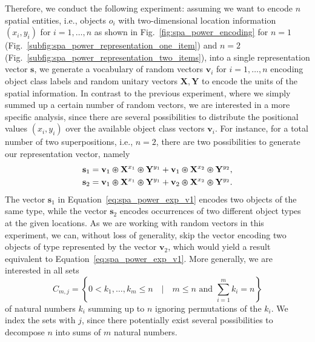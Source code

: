 Therefore, we conduct the following experiment: assuming we want to encode $n$ spatial entities, i.e., objects $o_{i}$ with two-dimensional location information $ \left(x_{i}, y_{i}\right)$ for $i=1, \ldots, n$ as shown in Fig.~\ref{fig:spa_power_encoding} for $n=1$ (Fig.~\ref{subfig:spa_power_representation_one_item}) and $n=2$ (Fig.~\ref{subfig:spa_power_representation_two_items}), into a single representation vector $ \mathbf{s}$, we generate a vocabulary of random vectors $
\mathbf{v}_{i}$ for $i=1, \ldots, n$ encoding object class labels and random unitary vectors $ \mathbf{X}, \mathbf{Y}$ to encode the units of the spatial information.
In contrast to the previous experiment, where we simply summed up a certain number of random vectors, we are interested in a more specific analysis, since there are several possibilities to distribute the positional values $ \left(x_{i}, y_{i}\right)$ over the available object class vectors $ \mathbf{v}_{i}$.
For instance, for a total number of two superpositions, i.e., $n=2$, there are two possibilities to generate our representation vector, namely
\begin{align}
    \mathbf{s}_{1} &= \mathbf{v}_{1} \varoast \mathbf{X}^{x_{1}} \varoast \mathbf{Y}^{y_{1}} + \mathbf{v}_{1} \varoast \mathbf{X}^{x_{2}} \varoast \mathbf{Y}^{y_{2}}, \label{eq:spa_power_exp_v1} \\
    \mathbf{s}_{2} &= \mathbf{v}_{1} \varoast \mathbf{X}^{x_{1}} \varoast \mathbf{Y}^{y_{1}} + \mathbf{v}_{2} \varoast \mathbf{X}^{x_{2}} \varoast \mathbf{Y}^{y_{2}}. \label{eq:spa_power_exp_v2} 
\end{align}
The vector $ \mathbf{s}_{1}$ in Equation~\eqref{eq:spa_power_exp_v1} encodes two objects of the same type, while the vector $ \mathbf{s}_{2}$ encodes occurrences of two different object types at the given locations.
As we are working with random vectors in this experiment, we can, without loss of generality, skip the vector encoding two objects of type represented by the vector $ \mathbf{v}_{2}$, which would yield a result equivalent to Equation~\eqref{eq:spa_power_exp_v1}.
More generally, we are interested in all sets
\begin{equation}
\label{eq:sum_combinations}
C_{m,j} = \left\{0 < k_{1}, \ldots, k_{m} \leq n \quad | \quad m \leq n \textrm{ and } \sum\limits_{i=1}^{m} k_{i} = n \right\}
\end{equation}
of natural numbers $k_{i}$ summing up to $n$ ignoring permutations of the $k_{i}$. 
We index the sets with $j$, since there potentially exist several possibilities to decompose $n$ into sums of $m$ natural numbers.

